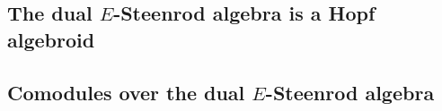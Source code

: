 \documentclass[../main.tex]{subfiles}
\begin{document}
\subsection{The dual \texorpdfstring{$E$}{E}-Steenrod algebra is a Hopf algebroid}

\subsection{Comodules over the dual \texorpdfstring{$E$}{E}-Steenrod algebra}
\end{document}
